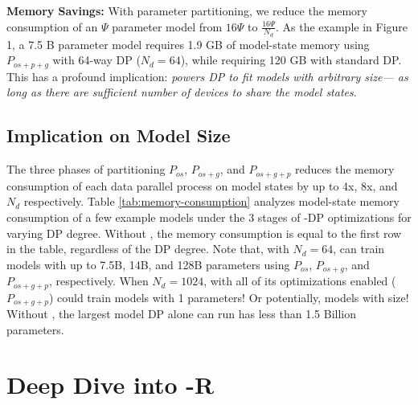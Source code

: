 \textbf{Memory Savings:} With parameter partitioning, we reduce the memory consumption of an $\Psi$ parameter model from $16\Psi$ to $\frac{16\Psi}{N_d}$.  As the example in Figure 1, a 7.5 B parameter model requires 1.9 GB  of model-state memory using $P_{os+p+g}$ with 64-way DP ($N_d = 64$), while requiring 120 GB with standard DP.  This has a profound implication: \emph{\name powers DP to fit models with arbitrary size— as long as there are sufficient number of devices to share the model states}. \begin{comment}
For example, on 32 GPU cluster with 32-way DP, we can run a 64B parameter model per GPU without any MP, while on a cluster of 512 GPU with 16-way MP and 32-way DP, we can train a $64 * 16B = 1T$ parameter model.  {\color{green} [Same example as in Figure 1 please]}
\end{comment}
\subsection{Implication on Model Size}\label{sec:summarymemoryoptimization}
The three phases of partitioning $P_{os}$, $P_{os+g}$, and $P_{os+g+p}$ reduces the memory consumption of each data parallel process on model states by up to 4x, 8x, and $N_d$ respectively.  
  Table \ref{tab:memory-consumption} analyzes model-state memory consumption of a few example models under the 3 stages of \name-DP optimizations for varying DP degree.  Without \name, the memory consumption is equal to the first row in the table, regardless of the DP degree. Note that, with $N_d=64$, \name can train models with up to 7.5B, 14B, and 128B parameters using $P_{os}$, $P_{os+g}$, and $P_{os+g+p}$, respectively.  When $N_d=1024$, \name with all of its optimizations enabled ($P_{os+g+p}$) could train models with 1 {} parameters!  Or potentially, models with {} size!  Without \name, the largest model DP alone can run has less than 1.5 Billion parameters.
  

\section{Deep Dive into \name-R}
